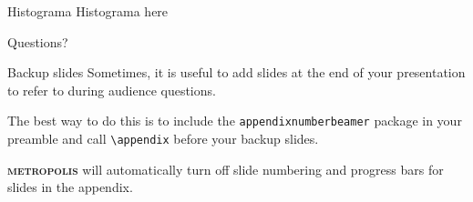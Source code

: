 \documentclass[10pt,xcolor={dvipsnames}]{beamer}
\newcommand{\themename}{\textbf{\textsc{metropolis}}\xspace}
\begin{document}
\begin{frame}[fragile]{Histograma}
	Histograma here
\end{frame}

{
\begin{frame}[standout]
  Questions?
\end{frame}
}

\begin{frame}[fragile]{Backup slides}
  Sometimes, it is useful to add slides at the end of your presentation to
  refer to during audience questions.

  The best way to do this is to include the \verb|appendixnumberbeamer|
  package in your preamble and call \verb|\appendix| before your backup slides.

  \themename will automatically turn off slide numbering and progress bars for
  slides in the appendix.
\end{frame}
\end{document}
